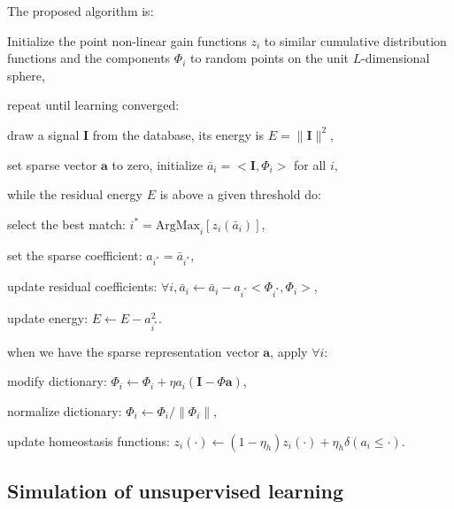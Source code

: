 \documentclass[a4paper, 11pt, draft]{article} %
\newcommand{\coef}{\mathbf{a}} %
\newcommand{\image}{\mathbf{I}} %
\newcommand{\dico}{\Phi} %
\begin{document}

The proposed algorithm is:
\begin{enumerate}%
{\color{MidnightBlue} 
\item Initialize the point non-linear gain functions $z_i$ to similar cumulative distribution functions and the components $\dico_i$ to random points on the unit $L$-dimensional sphere,%
\item repeat until learning converged:%
\begin{enumerate}%
{\color{OliveGreen}
	\item draw a signal $\image$ from the database, its energy is $E = \| \image \|^2$,%
	\item set sparse vector $\coef$ to zero, initialize $\bar{a}_i=<\image, \dico_i >$ for all $i$,%
	\item while the residual energy $E$ is above a given threshold do:
	\begin{enumerate}
		{\color{BrickRed}
			\item select the best match: $i^\ast = \mbox{ArgMax}_{i} [z_i( \bar{a}_i )]$,%
		}
		\item set the sparse coefficient: $a_{i^\ast} = \bar{a}_{i^\ast}$,
		\item update residual coefficients: $\forall i, \bar{a}_i \leftarrow \bar{a}_i - a_{i^\ast} <\dico_{i^\ast} , \dico_i > $,%
		\item update energy: $E \leftarrow E - a_{i^\ast}^2 $.
	\end{enumerate}
}
\item when we have the sparse representation vector $\coef$, apply $\forall i$:
\begin{enumerate}
\item modify dictionary: $\dico_{i} \leftarrow \dico_{i} + \eta a_{i} (\image - \dico\coef)$,%
\item normalize dictionary: $\dico_{i} \leftarrow \dico_{i} / \| \dico_{i}\|$,%
{\color{BrickRed}
\item update homeostasis functions: $z_i( \cdot ) \leftarrow (1- \eta_h ) z_i( \cdot ) + \eta_h \delta( a_i \leq \cdot)$.%
}
\end{enumerate}
\end{enumerate}
}
\end{enumerate}


\subsection{Simulation of unsupervised learning}
\end{document}
